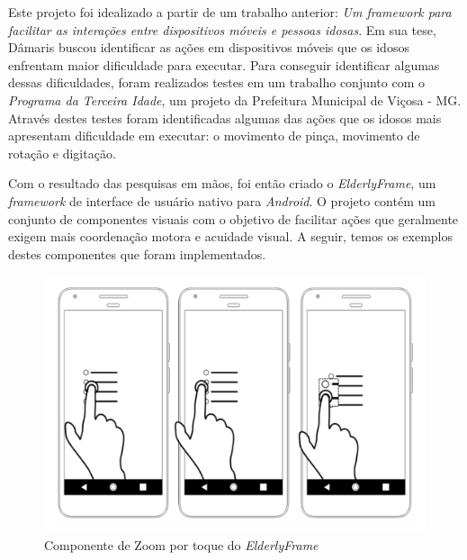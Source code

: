 \documentclass[
	12pt,				    %
	openright,			    %
	oneside,			    %
	a4paper,			    %
    sumario=tradicional,    %
	english,			    %
	brazil,				    %
	]{abntex2}              %
\begin{document}
Este projeto foi idealizado a partir de um trabalho anterior: \textit{Um framework para facilitar as interações entre dispositivos móveis e pessoas idosas}\cite{tesedamaris}. Em sua tese, Dâmaris buscou identificar as ações em dispositivos móveis que os idosos enfrentam maior dificuldade para executar. Para conseguir identificar algumas dessas dificuldades, foram realizados testes em um trabalho conjunto com o \emph{Programa da Terceira Idade}, um projeto da Prefeitura Municipal de Viçosa - MG. Através destes testes foram identificadas algumas das ações que os idosos mais apresentam dificuldade em executar: o movimento de pinça, movimento de rotação e digitação.

\par

Com o resultado das pesquisas em mãos, foi então criado o \textit{ElderlyFrame}\cite{elderlyframe}, um \textit{framework} de interface de usuário nativo para \textit{Android}. O projeto contém um conjunto de componentes visuais com o objetivo de facilitar ações que geralmente exigem mais coordenação motora e acuidade visual. A seguir, temos os exemplos destes componentes que foram implementados.

\begin{figure}[H]
	\begin{center}
		\includegraphics[height=0.4\linewidth]{images/touchable-zoom.png}
	\end{center}
	\caption[Componente \textit{TouchZoom} do \textit{ElderlyFrame}]{Componente de Zoom por toque do \textit{ElderlyFrame}}
	\label{fig:touchableZoom}
\end{figure}
\end{document}
